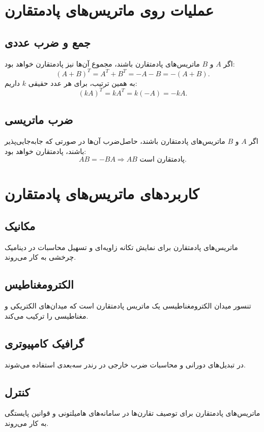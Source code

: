 \section*{عملیات روی ماتریس‌های پادمتقارن}

\subsection*{جمع و ضرب عددی}
اگر $A$ و $B$ ماتریس‌های پادمتقارن باشند، مجموع آن‌ها نیز پادمتقارن خواهد بود:
\begin{equation}
	(A + B)^T = A^T + B^T = -A - B = -(A+B).
\end{equation}
به همین ترتیب، برای هر عدد حقیقی $k$ داریم:
\begin{equation}
	(kA)^T = kA^T = k(-A) = -kA.
\end{equation}

\subsection*{ضرب ماتریسی}
اگر $A$ و $B$ ماتریس‌های پادمتقارن باشند، حاصل‌ضرب آن‌ها در صورتی که جابه‌جایی‌پذیر باشند، پادمتقارن خواهد بود:
\begin{equation}
	AB = -BA \Rightarrow AB \text{ پادمتقارن است}.
\end{equation}

\section*{کاربردهای ماتریس‌های پادمتقارن}

\subsection*{مکانیک}
ماتریس‌های پادمتقارن برای نمایش تکانه زاویه‌ای و تسهیل محاسبات در دینامیک چرخشی به کار می‌روند.

\subsection*{الکترومغناطیس}
تنسور میدان الکترومغناطیسی یک ماتریس پادمتقارن است که میدان‌های الکتریکی و مغناطیسی را ترکیب می‌کند.

\subsection*{گرافیک کامپیوتری}
در تبدیل‌های دورانی و محاسبات ضرب خارجی در رندر سه‌بعدی استفاده می‌شوند.

\subsection*{کنترل}
ماتریس‌های پادمتقارن برای توصیف تقارن‌ها در سامانه‌های هامیلتونی و قوانین پایستگی به کار می‌روند.

